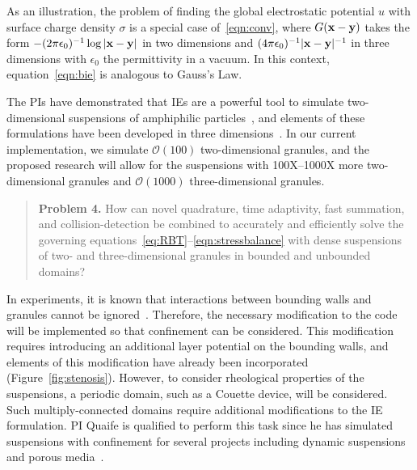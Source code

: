 As an illustration, the problem of finding the global electrostatic
potential $u$ with surface charge density $\sigma$ is a special case
of~\eqref{eqn:conv}, where $G(\mathbf{x} - \mathbf{y})$ takes the form $-(2\pi
\epsilon_0)^{-1}\log|\mathbf{x} - \mathbf{y}|$ in two dimensions and $(4\pi
\epsilon_0)^{-1}|\mathbf{x} -\mathbf{y}|^{-1}$ in three dimensions with $\epsilon_0$
the permittivity in a vacuum. In this context, equation~\eqref{eqn:bie}
is analogous to Gauss's Law.

The PIs have demonstrated that IEs are a powerful tool to simulate
two-dimensional suspensions of amphiphilic particles~\cite{Fu2018_SIAM,
FuQuRyYo22, fu-ryh-qua-you2022}, and elements of these formulations have
been developed in three dimensions~\cite{ying_2006, manasthesis,
rac-gre2016}. In our current implementation, we simulate
$\mathcal{O}(100)$ two-dimensional granules, and the proposed research
will allow for the suspensions with 100X--1000X more two-dimensional
granules and $\mathcal{O}(1000)$ three-dimensional granules. 

\begin{quotation}
  \noindent
  \textbf{Problem 4.} How can novel quadrature, time adaptivity, fast
  summation, and collision-detection be combined to accurately and
  efficiently solve the governing
  equations~\eqref{eq:RBT}--\eqref{eqn:stressbalance} with dense
  suspensions of two- and three-dimensional granules in bounded and
  unbounded domains?
\end{quotation}

In experiments, it is known that interactions between bounding walls and
granules cannot be ignored~\cite{qua-gan-you2021,
KaouiHartingMisbah2011_PRE, her-sto-gra2005}. Therefore, the necessary
modification to the code will be implemented so that confinement can be
considered. This modification requires introducing an additional layer
potential on the bounding walls, and elements of this modification have
already been incorporated (Figure~\ref{fig:stenosis}). However, to
consider rheological properties of the suspensions, a periodic domain,
such as a Couette device, will be considered. Such multiply-connected
domains require additional modifications to the IE formulation. PI
Quaife is qualified to perform this task since he has simulated
suspensions with confinement for several projects including dynamic
suspensions~\cite{qua-bir2014, bys-sha-qua2020} and porous
media~\cite{chi-moo-qua2020, dea-qua-bir-jua2018, moo-che-chi-qua2022,
qua-gan-you2021}.

